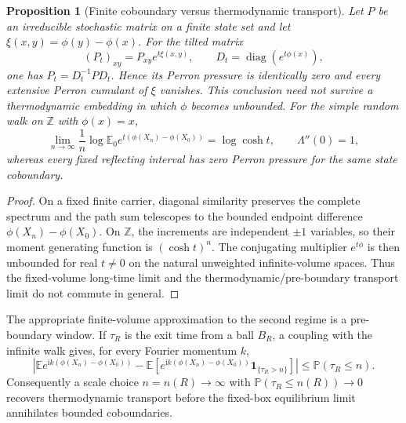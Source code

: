 \documentclass[11pt,a4paper,oneside]{book}
\theoremstyle{plain}
\newtheorem{proposition}[theorem]{Proposition}
\theoremstyle{definition}
\theoremstyle{remark}
\newcommand{\E}{\mathbb E}
\newcommand{\one}{\mathbf 1}
\newcommand{\ii}{\mathrm i}
\newcommand{\diag}{\operatorname{diag}}
\newcommand{\src}[2]{\cite{#1}}
\begin{document}
\begin{proposition}[Finite coboundary versus thermodynamic transport]
\label{prop:finite-thermodynamic-coboundary}
Let $P$ be an irreducible stochastic matrix on a finite state set and let
$\xi(x,y)=\phi(y)-\phi(x)$.  For the tilted matrix
\begin{equation}
 (P_t)_{xy}=P_{xy}e^{t\xi(x,y)},\qquad
 D_t=\diag(e^{t\phi(x)}),
\end{equation}
one has $P_t=D_t^{-1}PD_t$.  Hence its Perron pressure is identically
zero and every extensive Perron cumulant of $\xi$ vanishes.  This conclusion
need not survive a thermodynamic embedding in which $\phi$ becomes unbounded.
For the simple random walk on $\mathbb Z$ with $\phi(x)=x$,
\begin{equation}
 \lim_{n\to\infty}\frac1n\log\E_0
 e^{t(\phi(X_n)-\phi(X_0))}=\log\cosh t,
 \qquad \Lambda''(0)=1,
 \label{eq:thermodynamic-coboundary-example}
\end{equation}
whereas every fixed reflecting interval has zero Perron pressure for the same
state coboundary.
\end{proposition}
\begin{proof}
On a fixed finite carrier, diagonal similarity preserves the complete spectrum
and the path sum telescopes to the bounded endpoint difference
$\phi(X_n)-\phi(X_0)$.  On $\mathbb Z$, the increments are independent
$\pm1$ variables, so their moment generating function is $(\cosh t)^n$.
The conjugating multiplier $e^{t\phi}$ is then unbounded for real $t\ne0$ on
the natural unweighted infinite-volume spaces.  Thus the fixed-volume
long-time limit and the thermodynamic/pre-boundary transport limit do not
commute in general.
\end{proof}
\src{PP40}{thm:v40-fixed-finite-coboundary,prop:v40-z-counterexample}

The appropriate finite-volume approximation to the second regime is a
pre-boundary window.  If $\tau_R$ is the exit time from a ball $B_R$, a coupling
with the infinite walk gives, for every Fourier momentum $k$,
\begin{equation}
 \left|\E e^{\ii k(\phi(X_n)-\phi(X_0))}
 -\E\!\left[e^{\ii k(\phi(X_n)-\phi(X_0))}\one_{\{\tau_R>n\}}\right]\right|
 \le \mathbb P(\tau_R\le n).
 \label{eq:preboundary-transport}
\end{equation}
Consequently a scale choice $n=n(R)\to\infty$ with
$\mathbb P(\tau_R\le n(R))\to0$ recovers thermodynamic transport before the
fixed-box equilibrium limit annihilates bounded coboundaries.
\end{document}
